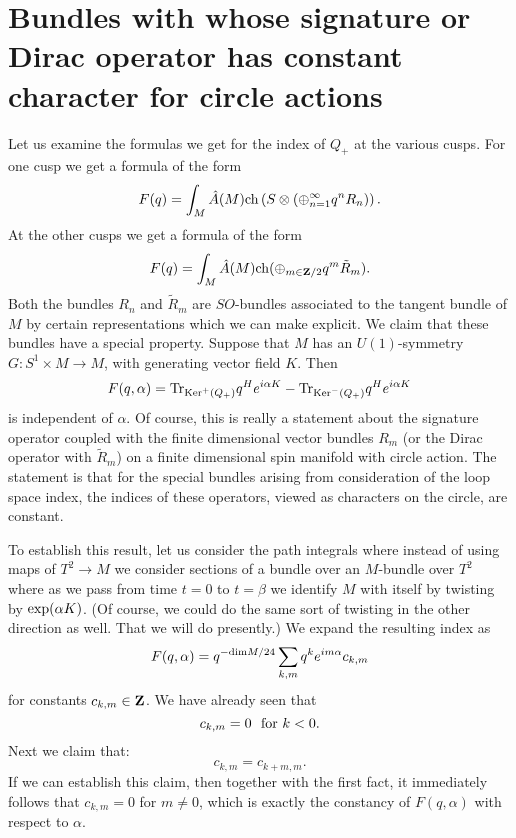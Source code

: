 \section{Bundles with whose signature  or Dirac
operator has constant character
for circle actions}

Let us examine the formulas we get for the index of $Q_+$ at the
various cusps. For one cusp we get a formula of the form
$$F(q)=\int_M\hat A(M){\rm ch}\left(S\otimes(\oplus_{n=1}^\infty q^n 
R_n)\right).$$  
At the other cusps we get a formula of the form
$$F(q)=\int_M\hat A(M){\rm ch}(\oplus_{m\in {\bf Z}/2}
 q^m \tilde R_m).$$  
Both the bundles $R_n$ and $\tilde R_m$ are $SO$-bundles associated to
the tangent bundle of $M$ by certain representations which we can make
explicit. 
We claim that these bundles  have a special property.
Suppose that $M$
has an $U(1)$-symmetry $G\colon S^1\times M\to M$, with generating
vector field $K$. Then
$$F(q,\alpha)={\rm Tr}_{{\rm Ker}^+(Q_+)}q^He^{i\alpha K}-{\rm
Tr}_{{\rm Ker}^-(Q_+)}q^He^{i\alpha K}$$
is independent of $\alpha$. 
Of course, this is really a statement about the signature operator 
 coupled with the finite
dimensional vector bundles $ R_m$ (or the Dirac operator with
$\tilde R_m$) on a finite dimensional spin manifold with circle action. The 
statement is that for the special 
bundles arising from consideration of the loop space
index, the indices of these operators, viewed as characters on the
circle, are constant.

To establish this result, let us consider the path integrals where
instead of using maps of $T^2\to M$ we consider sections of a bundle
over an $M$-bundle over $T^2$ where as we pass from time $t=0$ to
$t=\beta$ we identify $M$ with itself by twisting by ${\rm exp}(\alpha K)$.
(Of course, we could do the same sort of twisting in the other
direction as well. That we will do presently.)
We expand the resulting index as
$$F(q,\alpha)=q^{-{\rm dim}M/24}\sum_{k,m}q^ke^{im\alpha}c_{k,m}$$
for constants $c_{k,m}\in {\bf Z}$.
We have already seen that
$$c_{k,m}=0\ \ {\rm for\ }k<0.$$
Next we claim that:
$$c_{k,m}=c_{k+m,m}.$$
If we can establish this claim, then together with the first fact, it
immediately follows that $c_{k,m}=0$ for $m\not=0$, which is exactly
the constancy of $F(q,\alpha)$ with respect to $\alpha$.

